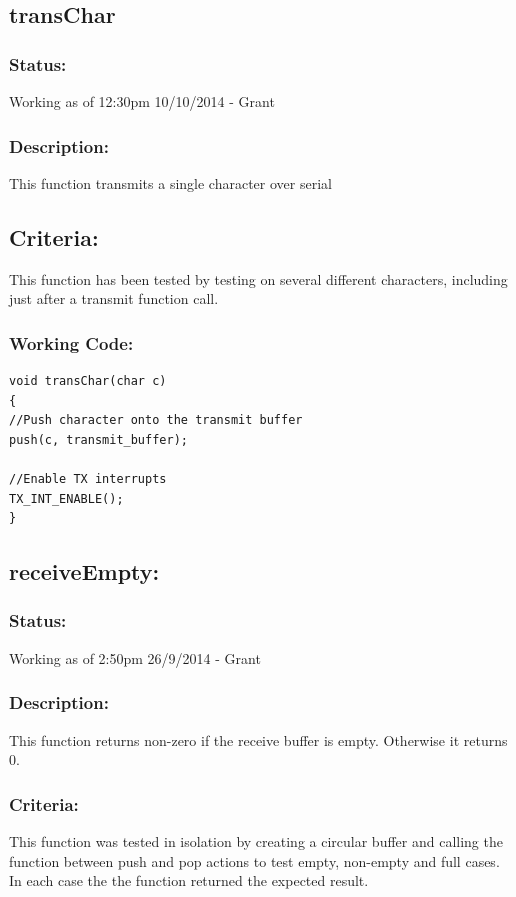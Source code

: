 \documentclass[]{report}
\begin{document}
\subsection{transChar}
\subsubsection{Status:}
Working as of 12:30pm 10/10/2014 - Grant

\subsubsection{Description:}
This function transmits a single character over serial

\subsection{Criteria:}
This function has been tested by testing on several different characters,  including just after a transmit function call.

\subsubsection{Working Code:}
\begin{lstlisting}
void transChar(char c)
{
//Push character onto the transmit buffer
push(c, transmit_buffer);

//Enable TX interrupts
TX_INT_ENABLE();
}
\end{lstlisting}

\subsection{receiveEmpty:}
\subsubsection{Status:}
Working as of 2:50pm 26/9/2014 - Grant

\subsubsection{Description:}
This function returns non-zero if the receive buffer is empty. Otherwise it returns 0.

\subsubsection{Criteria:}
This function was tested in isolation by creating a circular buffer and calling the function between push and pop actions to test empty, non-empty and full cases. In each case the the function returned the expected result.
\end{document}
